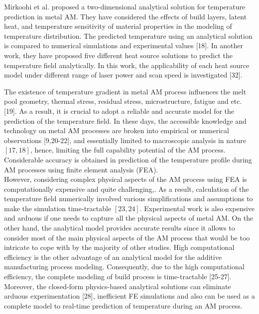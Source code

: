 \documentclass[10pt]{article}
\begin{document}
Mirkoohi et al. proposed a two-dimensional analytical solution for temperature prediction in metal AM. They have considered the effects of build layers, latent heat, and temperature sensitivity of material properties in the modeling of temperature distribution. The predicted temperature using an analytical solution is compared to numerical simulations and experimental values [18]. In another work, they have proposed five different heat source solutions to predict the temperature field analytically. In this work, the applicability of each heat source model under different range of laser power and scan speed is investigated [32].

The existence of temperature gradient in metal AM process influences the melt pool geometry, thermal stress, residual stress, microstructure, fatigue and etc. [19]. As a result, it is crucial to adopt a reliable and accurate model for the prediction of the temperature field. In these days, the accessible knowledge and technology on metal AM processes are broken into empirical or numerical observations [9,20-22], and essentially limited to macroscopic analysis in nature $[17,18]$, hence, limiting the full capability potential of the AM process. Considerable accuracy is obtained in prediction of the temperature profile during AM processes using finite element analysis (FEA).\\
However, considering complex physical aspects of the AM process using FEA is computationally expensive and quite challenging,. As a result, calculation of the temperature field numerically involved various simplifications and assumptions to make the simulation time-tractable $[23,24]$. Experimental work is also expensive and arduous if one needs to capture all the physical aspects of metal AM. On the other hand, the analytical model provides accurate results since it allows to consider most of the main physical aspects of the AM process that would be too intricate to cope with by the majority of other studies. High computational efficiency is the other advantage of an analytical model for the additive manufacturing process modeling. Consequently, due to the high computational efficiency, the complete modeling of build process is time-tractable [25-27]. Moreover, the closed-form physics-based analytical solutions can eliminate arduous experimentation [28], inefficient FE simulations and also can be used as a complete model to real-time prediction of temperature during an AM process.
\end{document}
